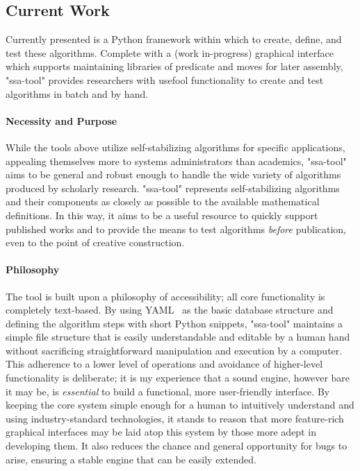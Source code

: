\subsection{Current Work}
\label{sec:introduction:current-work}
Currently presented is a Python framework within which to
  create, define, and test these algorithms.
Complete with a (work in-progress) graphical interface which supports
  maintaining libraries of predicate and moves for later assembly,
  "ssa-tool" provides researchers with usefool functionality
  to create and test algorithms in batch and by hand.

\paragraph{Necessity and Purpose}
While the tools above utilize self-stabilizing algorithms for specific applications,
  appealing themselves more to systems administrators than academics,
  "ssa-tool" aims to be general and robust enough to handle
  the wide variety of algorithms produced by scholarly research.
"ssa-tool" represents self-stabilizing algorithms and their components
  as closely as possible to the available mathematical definitions.
In this way, it aims to be a useful resource to quickly support published works
  and to provide the means to test algorithms \emph{before} publication,
  even to the point of creative construction.

\paragraph{Philosophy}
The tool is built upon a philosophy of accessibility;
  all core functionality is completely text-based.
By using YAML~\autocite{yaml:ref} as the basic database structure
  and defining the algorithm steps with short Python snippets,
  "ssa-tool" maintains a simple file structure that is easily
  understandable and editable by a human hand
  without sacrificing straightforward
  manipulation and execution by a computer.
This adherence to a lower level of operations and
  avoidance of higher-level functionality is deliberate;
  it is my experience that a sound engine, however bare it may be,
  is \emph{essential} to build a functional, more user-friendly interface.
By keeping the core system simple enough
  for a human to intuitively understand
  and using industry-standard technologies,
  it stands to reason that more feature-rich graphical interfaces
  may be laid atop this system
  by those more adept in developing them.
It also reduces the chance and general opportunity for bugs to arise,
  ensuring a stable engine that can be easily extended.

